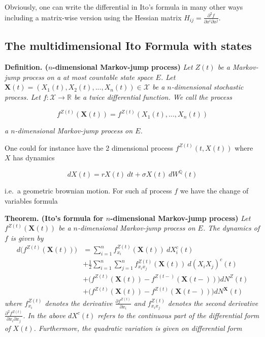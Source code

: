 \documentclass[a4paper,10pt,openany]{book}
\begin{document}
Obviously, one can write the differential in Ito's formula in many other ways including a matrix-wise version using the Hessian matrix \(H_{ij}=\frac{\partial^2 f}{\partial x^i\partial x^j}\).

\hypertarget{the-multidimensional-ito-formula-with-states}{%
\subsection{The multidimensional Ito Formula with states}\label{the-multidimensional-ito-formula-with-states}}

\textbf{Definition. (\(n\)-dimensional Markov-jump process)} \emph{Let \(Z(t)\) be a Markov-jump process on a at most countable state space \(E\). Let \(\mathbf X(t)=(X_1(t),X_2(t),...,X_n(t))\in\mathcal X\) be a \(n\)-dimensional stochastic process. Let \(f : \mathcal X\to \mathbb R\) be a twice differential function. We call the process}

\[
f^{Z(t)}(\mathbf X(t))=f^{Z(t)}(X_1(t),...,X_n(t))
\]

\emph{a \(n\)-dimensional Markov-jump process on \(E\).}

One could for instance have the 2 dimensional process \(f^{Z(t)}(t,X(t))\) where \(X\) has dynamics

\[
dX(t)=rX(t)\ dt + \sigma X(t)\ dW^\mathbb Q(t)
\]

i.e.~a geometric brownian motion. For such af process \(f\) we have the change of variables formula

\textbf{Theorem. (Ito's formula for \(n\)-dimensional Markov-jump process)} \emph{Let \(f^{Z(t)}(\mathbf X(t))\) be a \(n\)-dimensional Markov-jump process on \(E\). The dynamics of \(f\) is given by}
\begin{align*}
d \Big(f^{Z(t)}(\mathbf X(t))\Big)&=\sum_{i=1}^n f_{x_i}^{Z(t)}(\mathbf X(t))\ dX_i^c(t)\\
&+\frac{1}{2}\sum_{i=1}^n\sum_{j=1}^n f_{x_ix_j}^{Z(t)}(\mathbf X(t))\ d(X_iX_j)^c(t)\\
&+\Big(f^{Z(t)}(\mathbf X(t))-f^{Z(t-)}(\mathbf X(t-))\Big)dN^Z(t)\\
&+\Big(f^{Z(t)}(\mathbf X(t))-f^{Z(t)}(\mathbf X(t-))\Big)dN^\mathbf X(t)
\end{align*}
\emph{where \(f^{Z(t)}_{x_i}\) denotes the derivative \(\frac{\partial f^{Z(t)}}{\partial x_i}\) and \(f^{Z(t)}_{x_ix_j}\) denotes the second derivative \(\frac{\partial^2 f^{Z(t)}}{\partial x_i\partial x_j}\). In the above \(dX^c(t)\) refers to the continuous part of the differential form of \(X(t)\). Furthermore, the quadratic variation is given on differential form}
\end{document}
